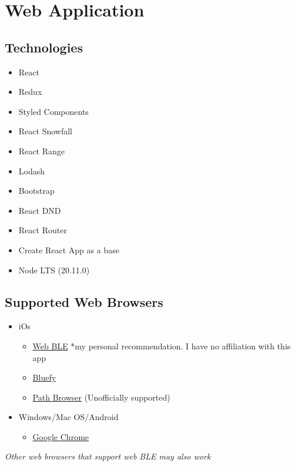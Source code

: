 \chapter{Web Application}
\section{Technologies}
\begin{itemize}
    \item React
    \item Redux
    \item Styled Components
    \item React Snowfall
    \item React Range
    \item Lodash
    \item Bootstrap
    \item React DND
    \item React Router
    \item Create React App as a base
    \item Node LTS (20.11.0)
\end{itemize}
\section{Supported Web Browsers}\label{sec:Supported Web Browsers}
\begin{itemize}
    \item iOs
        \begin{itemize}
            \item \href{https://apps.apple.com/us/app/webble/id1193531073}{Web BLE} *my personal recommendation. I have no affiliation with this app 
            \item \href{https://apps.apple.com/us/app/bluefy-web-ble-browser/id1492822055}{Bluefy}
            \item \href{https://apps.apple.com/us/app/path-browser/id1519521388}{Path Browser} (Unofficially supported)
        \end{itemize} 
    \item Windows/Mac OS/Android
        \begin{itemize}
            \item \href{https://www.google.com/chrome/Chrome}{Google Chrome}
        \end{itemize} 
\end{itemize}
\textit{Other web browsers that support web BLE may also work}
